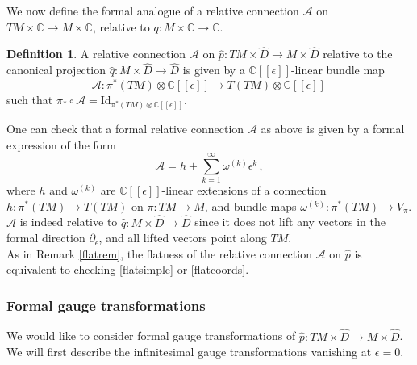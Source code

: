 \documentclass{article}
\theoremstyle{definition}
\newtheorem{definition}[theorem]{Definition}
\numberwithin{equation}{section}
\begin{document}
We now define the formal analogue of a relative connection $\mathcal{A}$ on $TM\times \mathbb{C}\to M\times \mathbb{C}$, relative to $q:M\times \mathbb{C}\to \mathbb{C}$.

\begin{definition}
A relative connection $\mathcal{A}$ on $\widehat{p}:TM\times \widehat{D}\to M\times \widehat{D}$ relative to the canonical projection $\hat{q}:M\times \widehat{D}\to \widehat{D}$ is given by a $\mathbb{C}[[\epsilon]]$-linear bundle map 
\begin{equation*}
    \mathcal{A}:\pi^*(TM)\otimes \mathbb{C}[[\epsilon]]\to T(TM)\otimes \mathbb{C}[[\epsilon]]\,
\end{equation*}
such that $\pi_*\circ \mathcal{A}=\text{Id}_{\pi^*(TM)\otimes \mathbb{C}[[\epsilon]]}$.

\end{definition}
One can check that a formal relative connection $\mathcal{A}$ as above is given by a formal expression of the form
\begin{equation*}
    \mathcal{A}=h+\sum_{k=1}^{\infty}\omega^{(k)}\epsilon^k\,,
\end{equation*}
where $h$ and $\omega^{(k)}$ are $\mathbb{C}[[\epsilon]]$-linear extensions of a connection $h:\pi^*(TM)\to T(TM)$ on $\pi: TM\to M$, and bundle maps $\omega^{(k)}:\pi^*(TM)\to V_{\pi}$. $\mathcal{A}$ is indeed relative to $\hat{q}:M\times \widehat{D}\to \widehat{D}$ since it does not lift any vectors in the formal direction $\partial_{\epsilon}$, and all lifted vectors point along $TM$.\\

As in Remark \ref{flatrem}, the flatness of the relative connection $\mathcal{A}$ on $\hat{p}$ is equivalent to checking \eqref{flatsimple} or \eqref{flatcoords}.
\subsubsection{Formal gauge transformations}
We would like to consider formal gauge transformations of $\widehat{p}:TM\times \widehat{D}\to M\times \widehat{D}$. We will first  describe the infinitesimal gauge transformations vanishing at $\epsilon=0$. 
\end{document}
